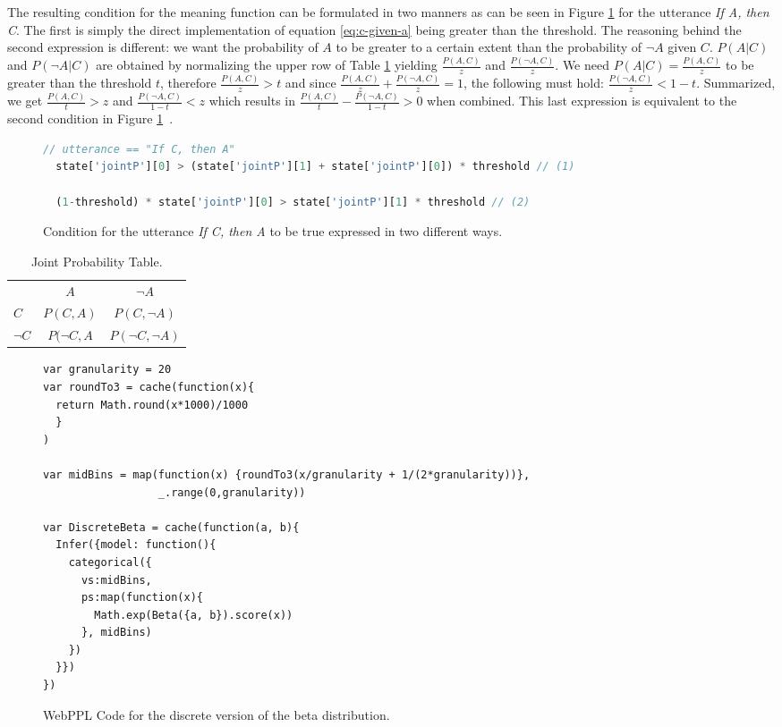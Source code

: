 The resulting condition for the meaning function can be formulated in two manners as can be seen in Figure \ref{code:meaning} for the utterance \textit{If A, then C}. The first is simply the direct implementation of equation \ref{eq:c-given-a} being greater than the threshold.  The reasoning behind the second expression is different: we want the probability of $A$ to be greater to a certain extent than the probability of $\neg A$ given $C$. $P(A|C)$ and $P(\neg A|C)$ are obtained by normalizing the upper row of Table \ref{table:joint} yielding $\frac{P(A,C)}{z}$ and $\frac{P(\neg A, C)}{z}$. We need $P(A|C) = \frac{P(A,C)}{z}$ to be greater than the threshold $t$, therefore $\frac{P(A,C)}{z} > t$ and since $\frac{P(A,C)}{z} + \frac{P(\neg A,C)}{z} = 1$, the following must hold: $\frac{P(\neg A,C)}{z} < 1-t$. Summarized, we get $\frac{P(A,C)}{t} > z$ and $\frac{P(\neg A, C)}{1-t} < z$ which results in $\frac{P(A,C)}{t} - \frac{P(\neg A, C)}{1-t} > 0$ when combined. This last expression is equivalent to the second condition in Figure \ref{code:meaning}~.


\begin{figure}[ht]
\begin{lstlisting}[language=javascript]
  // utterance == "If C, then A"
  state['jointP'][0] > (state['jointP'][1] + state['jointP'][0]) * threshold // (1)

  (1-threshold) * state['jointP'][0] > state['jointP'][1] * threshold // (2)    
\end{lstlisting}
\caption{Condition for the utterance \textit{If C, then A} to be true  expressed in two different ways.}
\label{code:meaning}
\end{figure}




\begin{table}[ht]
\centering
\begin{tabular}{lc|c}
& $A$ & $\neg A$ \\
\cline{2-3}
\multicolumn{1}{l|}{$C$} & $P(C,A)$ & \multicolumn{1}{c|}{$P(C,\neg A)$}\\ \hline
\multicolumn{1}{l|}{$\neg C$} & $P(\neg C, A$ & \multicolumn{1}{c|}{$P(\neg C, \neg A)$} \\\cline{2-3}
\end{tabular}
\caption{Joint Probability Table.}
\label{table:joint}
\end{table}


\begin{figure}
\begin{lstlisting}
var granularity = 20
var roundTo3 = cache(function(x){
  return Math.round(x*1000)/1000
  }
)

var midBins = map(function(x) {roundTo3(x/granularity + 1/(2*granularity))}, 
                  _.range(0,granularity))

var DiscreteBeta = cache(function(a, b){
  Infer({model: function(){
    categorical({
      vs:midBins,
      ps:map(function(x){
        Math.exp(Beta({a, b}).score(x))
      }, midBins)
    })
  }})
})
\end{lstlisting}
\caption{WebPPL Code for the discrete version of the beta distribution.}
\label{code:discreteBeta}
\end{figure}

